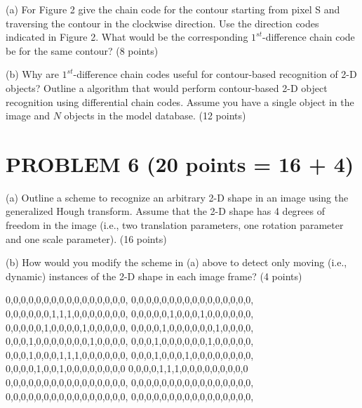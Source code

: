\documentclass[11pt]{article}
\theoremstyle{definition}
\begin{document}
(a) For Figure 2 give the chain code for the contour starting from pixel S and traversing the contour in the clockwise direction. Use the direction codes indicated in Figure 2. What would be the corresponding $1^{st}$-difference chain code be for the same contour? (8 points)

(b) Why are $1^{st}$-difference chain codes useful for contour-based recognition of 2-D objects? Outline a algorithm that would perform contour-based 2-D object recognition using differential chain codes. Assume you have a single object in the image and $N$ objects in the model database. (12 points)

\vspace{1cm}

\section*{PROBLEM 6 (20 points = 16 + 4)}

(a) Outline a scheme to recognize an arbitrary 2-D shape in an image using the generalized Hough transform. Assume that the 2-D shape has 4 degrees of freedom in the image (i.e., two translation parameters, one rotation parameter and one scale parameter). (16 points)

(b) How would you modify the scheme in (a) above to detect only moving (i.e., dynamic) instances of the 2-D shape in each image frame? (4 points)



0,0,0,0,0,0,0,0,0,0,0,0,0,0,0,0,
0,0,0,0,0,0,0,0,0,0,0,0,0,0,0,0,
0,0,0,0,0,0,1,1,1,0,0,0,0,0,0,0,
0,0,0,0,0,1,0,0,0,1,0,0,0,0,0,0,
0,0,0,0,0,1,0,0,0,0,1,0,0,0,0,0,
0,0,0,0,1,0,0,0,0,0,0,1,0,0,0,0,
0,0,0,1,0,0,0,0,0,0,0,1,0,0,0,0,
0,0,0,1,0,0,0,0,0,0,1,0,0,0,0,0,
0,0,0,1,0,0,0,1,1,1,0,0,0,0,0,0,
0,0,0,1,0,0,0,1,0,0,0,0,0,0,0,0,
0,0,0,0,1,0,0,1,0,0,0,0,0,0,0,0
0,0,0,0,1,1,1,0,0,0,0,0,0,0,0,0
0,0,0,0,0,0,0,0,0,0,0,0,0,0,0,0,
0,0,0,0,0,0,0,0,0,0,0,0,0,0,0,0,
0,0,0,0,0,0,0,0,0,0,0,0,0,0,0,0,
0,0,0,0,0,0,0,0,0,0,0,0,0,0,0,0,
\end{document}
